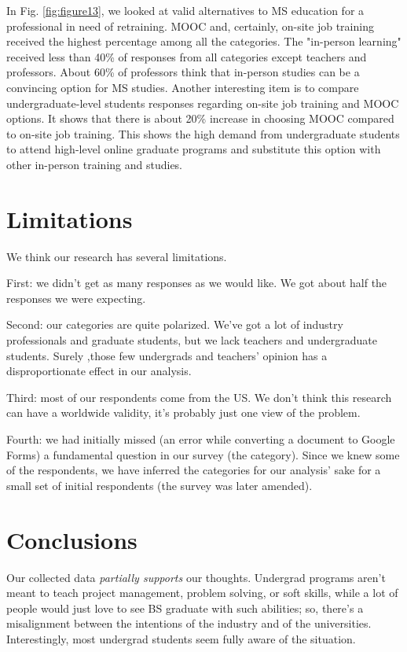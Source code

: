 \documentclass{sigchi}
\begin{document}
In Fig. \ref{fig:figure13}, we looked at valid alternatives to MS education for a professional in need of retraining. MOOC and, certainly, on-site job training received the highest percentage among all the categories. The "in-person learning" received less than 40\% of responses from all categories except teachers and professors. About 60\% of professors think that in-person studies can be a convincing option for MS studies. Another interesting item is to compare undergraduate-level students responses regarding on-site job training and MOOC options. It shows that there is about 20\% increase in choosing MOOC compared to on-site job training. This shows the high demand from undergraduate students to attend high-level online graduate programs and substitute this option with other in-person training and studies.

\section{Limitations}
 We think our research has several limitations.

First: we didn't get as many responses as we would like. We got about half the responses we were expecting.

Second: our categories are quite polarized. We've got a lot of industry professionals and graduate students, but we lack teachers and undergraduate students. Surely ,those few undergrads and teachers' opinion has a disproportionate effect in our analysis.

Third: most of our respondents come from the US. We don't think this research can have a worldwide validity, it's probably just one view of the problem.

Fourth: we had initially missed (an error while converting a document to Google Forms) a fundamental question in our survey (the category). Since we knew some of the respondents, we have inferred the categories for our analysis' sake for a small set of initial respondents (the survey was later amended).

\section{Conclusions}
Our collected data \textit{partially supports} our thoughts. Undergrad programs aren't meant to teach project management, problem solving, or soft skills, while a lot of people would just love to see BS graduate with such abilities; so, there's a misalignment between the intentions of the industry and of the universities. Interestingly, most undergrad students seem fully aware of the situation.
\end{document}
